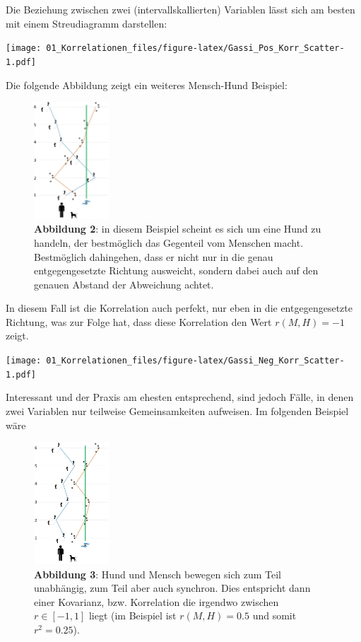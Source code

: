 \documentclass[
]{article}
\begin{document}
Die Beziehung zwischen zwei (intervallskallierten) Variablen lässt sich am besten mit einem Streudiagramm darstellen:

\texttt{[image: 01\_Korrelationen\_files/figure-latex/Gassi\_Pos\_Korr\_Scatter-1.pdf]}

Die folgende Abbildung zeigt ein weiteres Mensch-Hund Beispiel:

\begin{figure}
\centering
\includegraphics[width=0.25\textwidth,height=\textheight]{Images/GassiNegativeKorrelation.JPG}
\caption{\textbf{Abbildung 2}: in diesem Beispiel scheint es sich um eine Hund zu handeln, der bestmöglich das Gegenteil vom Menschen macht. Bestmöglich dahingehen, dass er nicht nur in die genau entgegengesetzte Richtung ausweicht, sondern dabei auch auf den genauen Abstand der Abweichung achtet.}
\end{figure}

In diesem Fall ist die Korrelation auch perfekt, nur eben in die entgegengesetzte Richtung, was zur Folge hat, dass diese Korrelation den Wert \(r(M,H) = -1\) zeigt.

\texttt{[image: 01\_Korrelationen\_files/figure-latex/Gassi\_Neg\_Korr\_Scatter-1.pdf]}

Interessant und der Praxis am ehesten entsprechend, sind jedoch Fälle, in denen zwei Variablen nur teilweise Gemeinsamkeiten aufweisen. Im folgenden Beispiel wäre

\begin{figure}
\centering
\includegraphics[width=0.25\textwidth,height=\textheight]{Images/GassiBeliebigeKorrelation.JPG}
\caption{\textbf{Abbildung 3}: Hund und Mensch bewegen sich zum Teil unabhängig, zum Teil aber auch synchron. Dies entspricht dann einer Kovarianz, bzw. Korrelation die irgendwo zwischen \(r \in [-1, 1]\) liegt (im Beispiel ist \(r(M,H) = 0.5\) und somit \(r^2 = 0.25\)).}
\end{figure}
\end{document}
